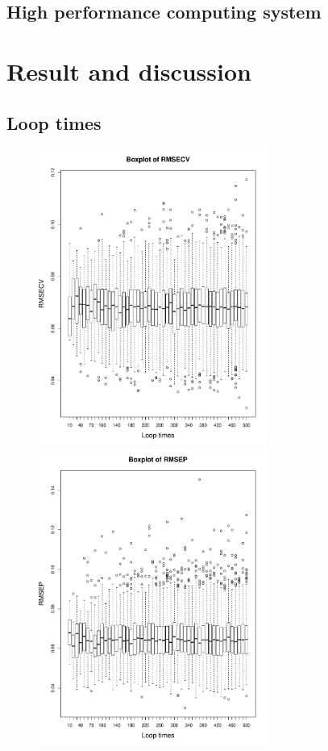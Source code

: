 \documentclass[a4paper,12pt,titlepage]{article} %
\numberwithin{equation}{section}  %
\begin{document}
	\subsection{High performance computing system}
	\label{myriad}
	
	
	\section{Result and discussion}
	\label{sec:result}
	
	\subsection{Loop times}
	\label{sec:Loop times}

	
	\begin{figure}[h]    %
		\centering           %
		\includegraphics[width=7.5cm, angle=0]{boxplot_RMSECV_loop_times_500.pdf}  %
		\includegraphics[width=7.5cm, angle=0]{boxplot_RMSEP_loop_times_500.pdf} %

\end{figure}
\end{document}
